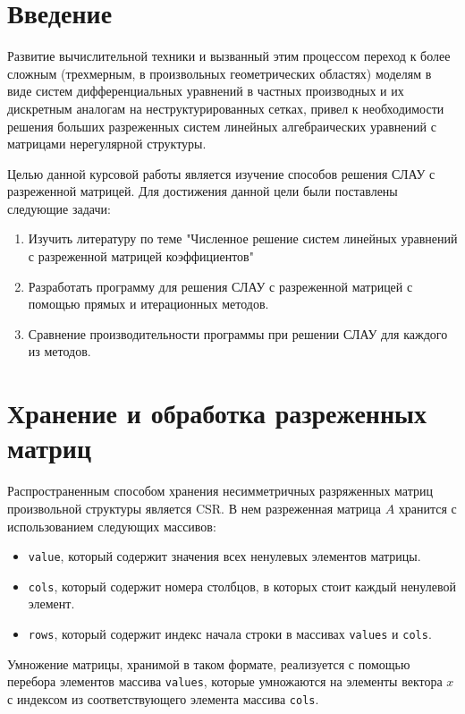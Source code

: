 \documentclass[a4paper, fontsize=14pt]{article}
\begin{document}


\tableofcontents

\newpage

\section*{Введение}

Развитие вычислительной техники и вызванный этим процессом переход к более сложным (трехмерным, 
в произвольных геометрических областях) моделям в виде систем дифференциальных уравнений в 
частных производных и их дискретным аналогам на неструктурированных сетках, привел к 
необходимости решения больших разреженных систем линейных алгебраических уравнений с 
матрицами нерегулярной структуры.

Целью данной курсовой работы является изучение способов решения СЛАУ с разреженной матрицей.
Для достижения данной цели были поставлены следующие задачи:
\begin{enumerate}
    \item Изучить литературу по теме "Численное решение систем линейных уравнений с разреженной
        матрицей коэффициентов"
    \item Разработать программу для решения СЛАУ с разреженной матрицей с помощью прямых и
        итерационных методов.
    \item Сравнение производительности программы при решении СЛАУ для каждого из методов.
\end{enumerate}
\newpage
\section{Хранение и обработка разреженных матриц}
Распространенным способом хранения несимметричных разряженных матриц произвольной структуры является
CSR. В нем разреженная матрица $A$ хранится с использованием следующих массивов:
\begin{itemize}
    \item \verb|value|, который содержит значения всех ненулевых элементов матрицы.
    \item \verb|cols|, который содержит номера столбцов, в которых стоит каждый ненулевой элемент.
    \item \verb|rows|, который содержит индекс начала строки в массивах \verb|values| и \verb|cols|.
\end{itemize}
Умножение матрицы, хранимой в таком формате, реализуется с помощью перебора элементов массива
\verb|values|, которые умножаются на элементы вектора $x$ с индексом из соответствующего
элемента массива \verb|cols|. 
\end{document}
